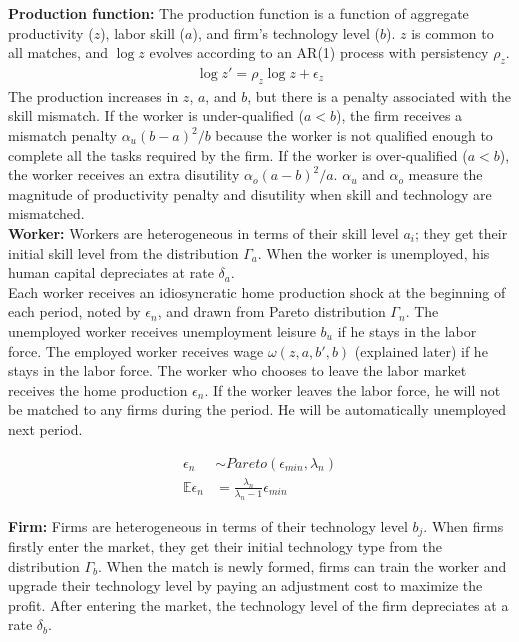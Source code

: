 \documentclass[12pt]{article}
\newcommand{\E}{\mathbb{E}}
\newcommand{\1}{\mathbb{1}}
\begin{document}
\textbf{Production function: }
The production function is a function of aggregate productivity ($z$), labor skill ($a$), and firm's technology level ($b$). $z$ is common to all matches, and $\log z$ evolves according to an AR(1) process with persistency $\rho_z$. 
\begin{align*}
\log z' = \rho_z \log z +\epsilon_z
\end{align*}
The production increases in $z$, $a$, and $b$, but there is a penalty associated with the skill mismatch. If the worker is under-qualified ($a<b$), the firm receives a mismatch penalty $\alpha_u(b-a)^2/b$ because the worker is not qualified enough to complete all the tasks required by the firm. If the worker is over-qualified ($a<b$), the worker receives an extra disutility $\alpha_o(a-b)^2/a$. $\alpha_u$ and $\alpha_o$ measure the magnitude of productivity penalty and disutility when skill and technology are mismatched.  \\

\textbf{Worker: }
Workers are heterogeneous in terms of their skill level $a_i$; they get their initial skill level from the distribution $\Gamma_a$. 
When the worker is unemployed, his human capital depreciates at rate $\delta_a$. \\

Each worker receives an idiosyncratic home production shock at the beginning of each period, noted by $\epsilon_n$, and drawn from Pareto distribution $\Gamma_n$. The unemployed worker receives unemployment leisure $b_u$ if he stays in the labor force. The employed worker receives wage $\omega(z,a,b',b)$ (explained later) if he stays in the labor force. The worker who chooses to leave the labor market receives the home production $\epsilon_n$. If the worker leaves the labor force, he will not be matched to any firms during the period. He will be automatically unemployed next period. 

\begin{align*}
\epsilon_n &\sim Pareto(\epsilon_{min},\lambda_n)  \\
\E\epsilon_n &= \frac{\lambda_n}{\lambda_n-1}\epsilon_{min}
\end{align*}

\textbf{Firm: }
Firms are heterogeneous in terms of their technology level $b_j$. 
When firms firstly enter the market, they get their initial technology type from the distribution $\Gamma_b$. 
When the match is newly formed, firms can train the worker and upgrade their technology level by paying an adjustment cost to maximize the profit. 
After entering the market, the technology level of the firm depreciates at a rate $\delta_b$. \\
\end{document}
